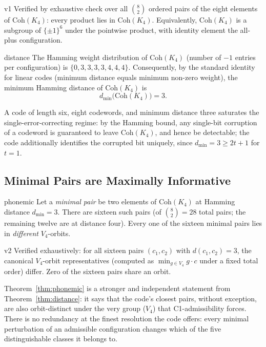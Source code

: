 \documentclass[11pt,a4paper]{article}
\newcommand{\Kfour}{K_4}
\newcommand{\Coh}{\mathrm{Coh}}
\newcommand{\Vfour}{V_4}
\begin{document}
\begin{verifbox}{}{v1}
Verified by exhaustive check over all $\binom{8}{2}$ ordered pairs of the eight elements of $\Coh(\Kfour)$: every product lies in $\Coh(\Kfour)$. Equivalently, $\Coh(\Kfour)$ is a subgroup of $\{\pm1\}^6$ under the pointwise product, with identity element the all-plus configuration.
\end{verifbox}

\begin{theorembox}{}{distance}
The Hamming weight distribution of $\Coh(\Kfour)$ (number of $-1$ entries per configuration) is $\{0,3,3,3,3,4,4,4\}$. Consequently, by the standard identity for linear codes (minimum distance equals minimum non-zero weight), the minimum Hamming distance of $\Coh(\Kfour)$ is
\begin{equation}
d_{\min}\bigl(\Coh(\Kfour)\bigr) = 3.
\end{equation}
\end{theorembox}

A code of length six, eight codewords, and minimum distance three saturates the single-error-correcting regime: by the Hamming bound, any single-bit corruption of a codeword is guaranteed to leave $\Coh(\Kfour)$, and hence be detectable; the code additionally identifies the corrupted bit uniquely, since $d_{\min}=3\ge 2t+1$ for $t=1$.

\subsection{Minimal Pairs are Maximally Informative}

\begin{theorembox}{}{phonemic}
Let a \emph{minimal pair} be two elements of $\Coh(\Kfour)$ at Hamming distance $d_{\min}=3$. There are sixteen such pairs (of $\binom82=28$ total pairs; the remaining twelve are at distance four). Every one of the sixteen minimal pairs lies in \emph{different} $\Vfour$-orbits.
\end{theorembox}

\begin{verifbox}{}{v2}
Verified exhaustively: for all sixteen pairs $(c_1,c_2)$ with $d(c_1,c_2)=3$, the canonical $\Vfour$-orbit representatives (computed as $\min_{g\in\Vfour} g\cdot c$ under a fixed total order) differ. Zero of the sixteen pairs share an orbit.
\end{verifbox}

Theorem~\ref{thm:phonemic} is a stronger and independent statement from Theorem~\ref{thm:distance}: it says that the code's closest pairs, without exception, are also orbit-distinct under the very group ($\Vfour$) that C1-admissibility forces. There is no redundancy at the finest resolution the code offers: every minimal perturbation of an admissible configuration changes which of the five distinguishable classes it belongs to.
\end{document}

